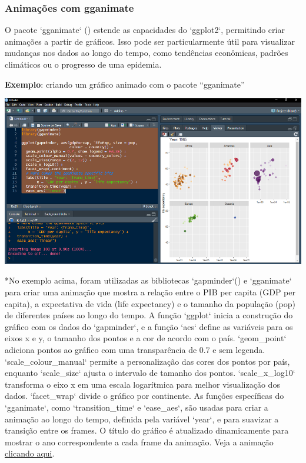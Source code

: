 \documentclass[
]{book}
\begin{document}
\subsubsection{Animações com gganimate}\label{animauxe7uxf5es-com-gganimate}

O pacote `gganimate` () estende as capacidades do `ggplot2`, permitindo criar animações a partir de gráficos. Isso pode ser particularmente útil para visualizar mudanças nos dados ao longo do tempo, como tendências econômicas, padrões climáticos ou o progresso de uma epidemia.

\textbf{Exemplo}: criando um gráfico animado com o pacote ``gganimate''

\includegraphics{images/clipboard-342580043.png}

*No exemplo acima, foram utilizadas as bibliotecas `gapminder`() e `gganimate` para criar uma animação que mostra a relação entre o PIB per capita (GDP per capita), a expectativa de vida (life expectancy) e o tamanho da população (pop) de diferentes países ao longo do tempo. A função `ggplot` inicia a construção do gráfico com os dados do `gapminder`, e a função `aes` define as variáveis para os eixos x e y, o tamanho dos pontos e a cor de acordo com o país. `geom\_point` adiciona pontos ao gráfico com uma transparência de 0.7 e sem legenda. `scale\_colour\_manual` permite a personalização das cores dos pontos por país, enquanto `scale\_size` ajusta o intervalo de tamanho dos pontos. `scale\_x\_log10` transforma o eixo x em uma escala logarítmica para melhor visualização dos dados. `facet\_wrap` divide o gráfico por continente. As funções específicas do `gganimate`, como `transition\_time` e `ease\_aes`, são usadas para criar a animação ao longo do tempo, definida pela variável `year`, e para suavizar a transição entre os frames. O título do gráfico é atualizado dinamicamente para mostrar o ano correspondente a cada frame da animação. Veja a animação \href{https://gganimate.com/reference/figures/README-unnamed-chunk-4-1.gif}{clicando aqui}.
\end{document}
